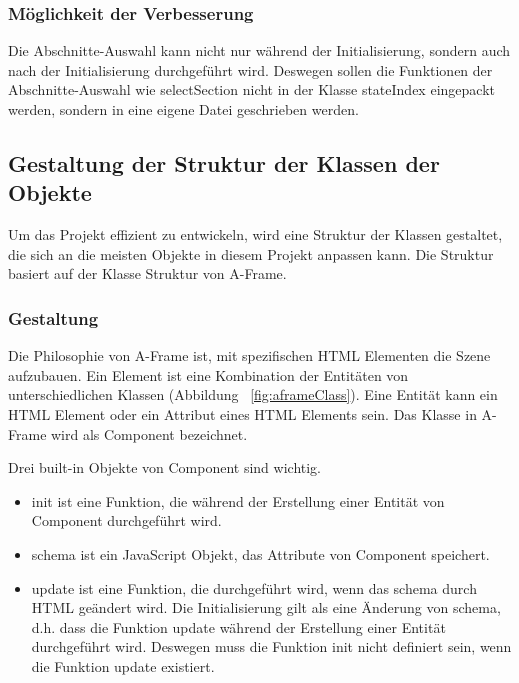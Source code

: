   \subsubsection{Möglichkeit der Verbesserung}
  Die Abschnitte-Auswahl kann nicht nur während der Initialisierung, sondern auch nach der Initialisierung durchgeführt wird. Deswegen sollen die Funktionen der Abschnitte-Auswahl wie {\selectfont selectSection} nicht in der Klasse {\selectfont stateIndex} eingepackt werden, sondern in eine eigene Datei geschrieben werden.
  
 \subsection{Gestaltung der Struktur der Klassen der Objekte}
 Um das Projekt effizient zu entwickeln, wird eine Struktur der Klassen gestaltet, die sich an die meisten Objekte in diesem Projekt anpassen kann. Die Struktur basiert auf der Klasse Struktur von A-Frame.
 
 \subsubsection{Gestaltung}
 Die Philosophie von A-Frame ist, mit spezifischen HTML Elementen die Szene aufzubauen. Ein Element ist eine Kombination der Entitäten von unterschiedlichen Klassen (Abbildung ~\ref{fig:aframeClass}). Eine Entität kann ein HTML Element oder ein Attribut eines HTML Elements sein. Das Klasse in A-Frame wird als Component bezeichnet.
 
 Drei built-in Objekte von Component sind wichtig.
 \begin{itemize}
     \item {\selectfont init} ist eine Funktion, die während der Erstellung einer Entität von Component durchgeführt wird.
     \item {\selectfont schema} ist ein JavaScript Objekt, das Attribute von Component speichert.
     \item {\selectfont update} ist eine Funktion, die durchgeführt wird, wenn das schema durch HTML geändert wird. Die Initialisierung gilt als eine Änderung von schema, d.h. dass die Funktion update während der Erstellung einer Entität durchgeführt wird. Deswegen muss die Funktion init nicht definiert sein, wenn die Funktion update existiert.
 \end{itemize}
 
